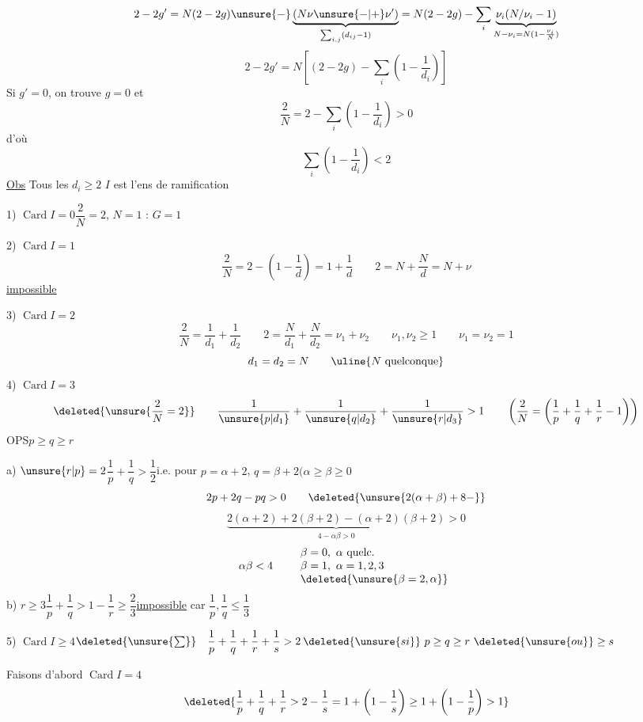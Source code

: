 \[
2-2g'=N(2-2g)\unsure{-}\underbrace{(N\nu\unsure{-|+}\nu')}_{\sum_{i,j}(d_{ij}-1)}
=N(2-2g)-\sum_i\underbrace{\nu_i(N/\nu_i-1)}_{N-\nu_i=N(1-\frac{\nu_i}{N})}
\]
\[
\boxed{2-2g'=N\left[(2-2g)-\sum_i\left(1-\frac1{d_i}\right)\right]}
\]
Si $g'=0$, on trouve $g=0$ et
\[
\boxed{\frac2N=2-\sum_i\left(1-\frac1{d_i}\right)>0}
\]
d'où
\[
\sum_i\left(1-\frac1{d_i}\right)<2
\]
\uline{Obs} Tous les $d_i\geq2$   $I$ est \uline{} l'ens de ramification

1) $\operatorname{Card}I=0$\qquad $\dfrac2N=2$, $N=1$ :  $G=1$

2) $\operatorname{Card}I=1$
\[
\frac2N=2-\left(1-\frac1d\right)=1+\frac1d\qquad
2=N+\frac Nd=N+\nu
\]
\uline{impossible}

3) $\operatorname{Card}I=2$
\[
\frac2N=\frac1{d_1}+\frac1{d_2}\qquad
2=\frac N{d_1}+\frac N{d_2}=\nu_1+\nu_2\qquad
\nu_1,\nu_2\geq1\qquad\nu_1=\nu_2=1
\]
\[
d_1=d_2=N\qquad\uline{N\text{ quelconque}}
\]
4) $\operatorname{Card}I=3$
\[
\deleted{\unsure{\frac2N=2}}\qquad
\frac1{\unsure{p|d_1}}+\frac1{\unsure{q|d_2}}+\frac1{\unsure{r|d_3}}>1
\qquad\left(\frac2N=\left(\frac1p+\frac1q+\frac1r-1\right)\right)
\]
OPS\qquad $p\geq q\geq r$

a) $\unsure{r|p}=2$\qquad $\dfrac1p+\dfrac1q>\dfrac12$\qquad i.e. pour $p=\alpha+2$, $q=\beta+2$\quad $(\alpha\geq\beta\geq0$
\margin{$\unsure{\alpha}$}
\[
2p+2q-pq>0\qquad\deleted{\unsure{2(\alpha+\beta)+8-}}
\]
\[
\underbrace{2(\alpha+2)+2(\beta+2)-(\alpha+2)(\beta+2)}_{4-\alpha\beta>0}>0
\]
\[
\alpha\beta<4\qquad
\begin{array}{l}
\beta=0,\ \alpha\text{ quelc.}\\
\beta=1,\ \alpha=1,2,3\\
\deleted{\unsure{\beta=2,\alpha}}
\end{array}
\]
b) $r\geq3$\qquad $\dfrac1p+\dfrac1q>1-\dfrac1r\geq\dfrac23$\quad\uline{impossible} car $\dfrac1p,\dfrac1q\leq\dfrac13$

5) $\operatorname{Card}I\geq4$\qquad $\deleted{\unsure{\sum}}\quad\dfrac1p+\dfrac1q+\dfrac1r+\dfrac1s>2$\qquad $\deleted{\unsure{si}}\ p\geq q\geq r\ \deleted{\unsure{ou}}\geq s$

Faisons d'abord $\operatorname{Card}I=4$
\[
\deleted{\frac1p+\frac1q+\frac1r>2-\frac1s=1+\left(1-\frac1s\right)\geq1+\left(1-\frac1p\right)>1}
\]

